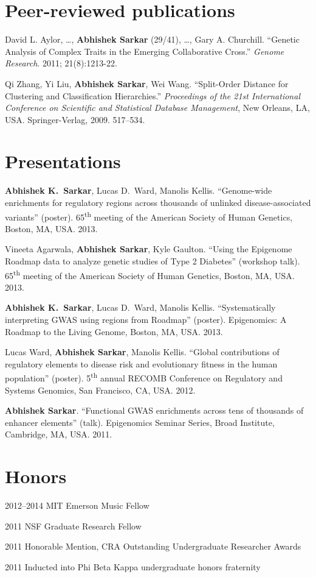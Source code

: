 \documentclass{article}
\begin{document}
\section*{Peer-reviewed publications}
\begin{henum}
\item David L. Aylor, \ldots, \textbf{Abhishek Sarkar} (29/41), \ldots, Gary A.
  Churchill. ``Genetic Analysis of Complex Traits in the Emerging Collaborative
  Cross.'' \emph{Genome Research}. 2011; 21(8):1213-22.

\item Qi Zhang, Yi Liu, \textbf{Abhishek Sarkar}, Wei Wang. ``Split-Order
  Distance for Clustering and Classification Hierarchies.'' \emph{Proceedings
    of the 21st International Conference on Scientific and Statistical Database
    Management}, New Orleans, LA, USA. Springer-Verlag, 2009. 517–534.
\end{henum}

\section*{Presentations}
\begin{henum}
\item \textbf{Abhishek K.\ Sarkar}, Lucas D.\ Ward, Manolis
  Kellis. ``Genome-wide enrichments for regulatory regions across thousands of
  unlinked disease-associated variants'' (poster). 65\textsuperscript{th}
  meeting of the American Society of Human Genetics, Boston, MA, USA. 2013.
\item Vineeta Agarwala, \textbf{Abhishek Sarkar}, Kyle Gaulton. ``Using the
  Epigenome Roadmap data to analyze genetic studies of Type 2 Diabetes''
  (workshop talk). 65\textsuperscript{th} meeting of the American Society of
  Human Genetics, Boston, MA, USA. 2013.
\item \textbf{Abhishek K.\ Sarkar}, Lucas D.\ Ward, Manolis
  Kellis. ``Systematically interpreting GWAS using regions from Roadmap''
  (poster). Epigenomics: A Roadmap to the Living Genome, Boston, MA, USA. 2013.
\item Lucas Ward, \textbf{Abhishek Sarkar}, Manolis Kellis. ``Global
  contributions of regulatory elements to disease risk and evolutionary fitness
  in the human population'' (poster). 5\textsuperscript{th} annual RECOMB
  Conference on Regulatory and Systems Genomics, San Francisco, CA, USA. 2012.
\item \textbf{Abhishek Sarkar}. ``Functional GWAS enrichments across tens of
  thousands of enhancer elements'' (talk). Epigenomics Seminar Series, Broad
  Institute, Cambridge, MA, USA. 2011.
\end{henum}

\section*{Honors}
\begin{hdesc}
\item[2012--2014] MIT Emerson Music Fellow
\item[2011] NSF Graduate Research Fellow
\item[2011] Honorable Mention, CRA Outstanding Undergraduate Researcher Awards
\item[2011] Inducted into Phi Beta Kappa undergraduate honors fraternity
\end{hdesc}
\end{document}
